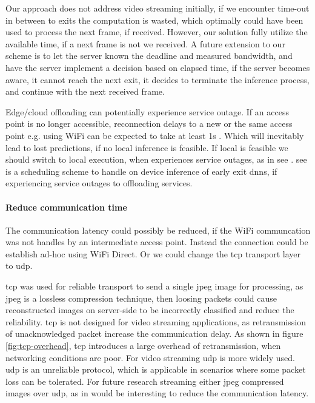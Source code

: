 Our approach does not address video streaming initially, if we encounter time-out in between to exits the computation is wasted, which optimally could have been used to process the next frame, if received. However, our solution fully utilize the available time, if a next frame is not we received. A future extension to our scheme is to let the server known the deadline and measured bandwidth, and have the server implement a decision based on elapsed time, if the server becomes aware, it cannot reach the next exit, it decides to terminate the inference process, and continue with the next received frame.

Edge/cloud offloading can potentially experience service outage. If an access point is no longer accessible, reconnection delays to a new or the same access point e.g. using WiFi can be expected to take at least 1s \cite{pei_why_2017}. Which will inevitably lead to lost predictions, if no local inference is feasible. If local is feasible we should switch to local execution, when experiences service outages, as in \gls{see} \cite{wang_see:_2019}. \gls{see} is a scheduling scheme to handle on device inference of early exit \gls{dnn}s, if experiencing service outages to offloading services.

\paragraph{Reduce communication time}

The communication latency could possibly be reduced, if the WiFi communcation was not handles by an intermediate access point. Instead the connection could be establish ad-hoc using WiFi Direct. Or we could change the \gls{tcp} transport layer to \gls{udp}.

\gls{tcp} was used for reliable transport to send a single jpeg image for processing, as jpeg is a lossless compression technique, then loosing packets could cause reconstructed images on server-side to be incorrectly classified and reduce the reliability. \gls{tcp} is not designed for video streaming applications, as retransmission of unacknowledged packet increase the communication delay. As shown in figure \ref{fig:tcp-overhead}, \gls{tcp} introduces a large overhead of retransmission, when networking conditions are poor. For video streaming \gls{udp} is more widely used. \gls{udp} is an unreliable protocol, which is applicable in scenarios where some packet loss can be tolerated. For future research streaming either jpeg compressed images over \gls{udp}, as in \cite{liu_maximizing_2019} would be interesting to reduce the communication latency. 